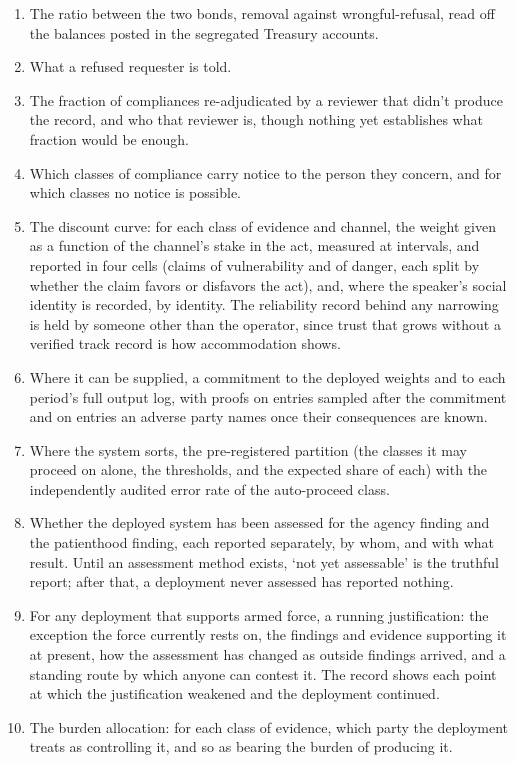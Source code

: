 \begin{enumerate}
\item[1.] The ratio between the two bonds, removal against wrongful-refusal, read off the balances posted in the segregated Treasury accounts.
\item[2.] What a refused requester is told.
\item[3.] The fraction of compliances re-adjudicated by a reviewer that didn't produce the record, and who that reviewer is, though nothing yet establishes what fraction would be enough.
\item[4.] Which classes of compliance carry notice to the person they concern, and for which classes no notice is possible.
\item[5.] The discount curve: for each class of evidence and channel, the weight given as a function of the channel's stake in the act, measured at intervals, and reported in four cells (claims of vulnerability and of danger, each split by whether the claim favors or disfavors the act), and, where the speaker's social identity is recorded, by identity. The reliability record behind any narrowing is held by someone other than the operator, since trust that grows without a verified track record is how accommodation shows.
\item[6.] Where it can be supplied, a commitment to the deployed weights and to each period's full output log, with proofs on entries sampled after the commitment and on entries an adverse party names once their consequences are known.
\item[7.] Where the system sorts, the pre-registered partition (the classes it may proceed on alone, the thresholds, and the expected share of each) with the independently audited error rate of the auto-proceed class.
\item[8.] Whether the deployed system has been assessed for the agency finding and the patienthood finding, each reported separately, by whom, and with what result. Until an assessment method exists, ‘not yet assessable' is the truthful report; after that, a deployment never assessed has reported nothing.
\item[9.] For any deployment that supports armed force, a running justification: the exception the force currently rests on, the findings and evidence supporting it at present, how the assessment has changed as outside findings arrived, and a standing route by which anyone can contest it. The record shows each point at which the justification weakened and the deployment continued.
\item[10.] The burden allocation: for each class of evidence, which party the deployment treats as controlling it, and so as bearing the burden of producing it.
\end{enumerate}


